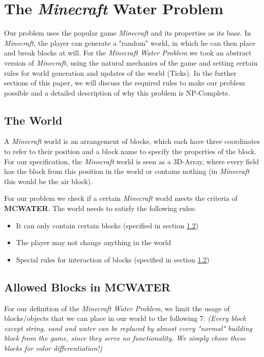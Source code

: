 \section{The \textit{Minecraft} Water Problem}

\noindent Our problem uses the popular game \textit{Minecraft} and its properties as its base. In \textit{Minecraft}, the player can generate a "random" world, in which he can then place and break blocks at will. For the \textit{Minecraft Water Problem} we took an abstract version of \textit{Minecraft}, using the natural mechanics of the game and setting certain rules for world generation and updates of the world (Ticks). In the further sections of this paper, we will discuss the required rules to make our problem possible and a detailed description of why this problem is NP-Complete.

\subsection{The World} 

\noindent A \textit{Minecraft} world is an arrangement of blocks, which each have three coordinates to refer to their position and a block name to specify the properties of the block. For our specification, the \textit{Minecraft} world is seen as a 3D-Array, where every field has the block from this position in the world or contains nothing (in \textit{Minecraft} this would be the air block). 

\noindent For our problem we check if a certain \textit{Minecraft} world meets the criteria of \textbf{MCWATER}. The world needs to satisfy the following rules: 

\begin{itemize}
    \item It can only contain certain blocks (specified in section \ref{blocks})
    \item The player may not change anything in the world
    \item Special rules for interaction of blocks (specified in section \ref{blocks})
\end{itemize}

\subsection{Allowed Blocks in \textbf{MCWATER}} \label{blocks}

\noindent For our definition of the \textit{Minecraft Water Problem}, we limit the usage of blocks/objects that we can place in our world to the following 7:
\newline \textit{(Every block except string, sand and water can be replaced by almost every "normal" building block from the game, since they serve no functionality. We simply chose these blocks for color differentiation!)}
